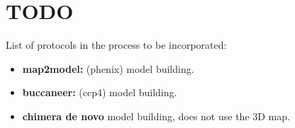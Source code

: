\section{TODO}

List of protocols in the process to be incorporated:

\begin{itemize}
 \item \textbf{map2model:} (phenix)  model building.
 \item \textbf{buccaneer:} (ccp4)  model building.
 \item \textbf{chimera de novo}  model building, does not use the 3D map.
\end{itemize}
